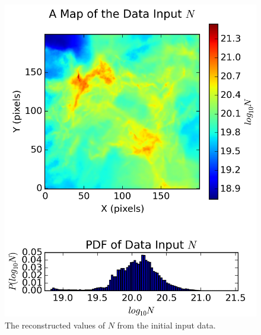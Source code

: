 \documentclass{report}
\begin{document}
\begin{figure}[H]
\begin{minipage}[b]{0.25\linewidth}
    \includegraphics[width=\linewidth]{../img/sph/map_N_data.png}
    \caption{\protect The reconstructed values of $N$ from the initial input data.}\label{fig:map_N_data_sph}
    \vspace{4ex}
  \end{minipage}
  \begin{minipage}[b]{0.25\linewidth}
    \centering

\end{minipage}
\end{figure}
\end{document}

